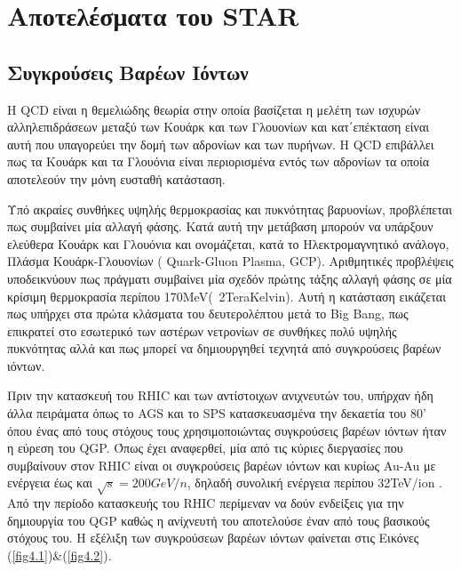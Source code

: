 \chapter{Αποτελέσματα του STAR}

\section{Συγκρούσεις Βαρέων Ιόντων}

	Η QCD  είναι η θεμελιώδης θεωρία στην οποία βασίζεται η μελέτη των ισχυρών αλληλεπιδράσεων μεταξύ των Κουάρκ και των Γλουονίων και κατ΄επέκταση είναι αυτή που υπαγορεύει την δομή των αδρονίων και των πυρήνων.
	Η 	QCD επιβάλλει πως τα Κουάρκ και τα Γλουόνια είναι περιορισμένα εντός των αδρονίων τα οποία αποτελεούν την μόνη ευσταθή κατάσταση.
	
	Υπό ακραίες συνθήκες υψηλής θερμοκρασίας και πυκνότητας βαρυονίων, προβλέπεται πως συμβαίνει μία αλλαγή φάσης. Κατά αυτή την μετάβαση μπορούν να υπάρξουν ελεύθερα Κουάρκ και Γλουόνια και ονομάζεται, κατά το Ηλεκτρομαγνητικό ανάλογο, Πλάσμα Κουάρκ-Γλουονίων ( Quark-Gluon Plasma, GCP).  
	Αριθμητικές προβλέψεις υποδεικνύουν πως πράγματι συμβαίνει μία σχεδόν πρώτης τάξης αλλαγή φάσης σε μία κρίσιμη θερμοκρασία περίπου 170MeV(~2TeraKelvin).
	Αυτή η κατάσταση εικάζεται πως υπήρχει στα πρώτα κλάσματα του δευτερολέπτου μετά το Big Bang, πως επικρατεί στο εσωτερικό των αστέρων νετρονίων σε συνθήκες πολύ υψηλής πυκνότητας αλλά και πως μπορεί να δημιουργηθεί τεχνητά από συγκρούσεις βαρέων ιόντων.
		
	
	Πριν την κατασκευή του RHIC και των αντίστοιχων ανιχνευτών του, υπήρχαν ήδη άλλα πειράματα όπως το AGS και το SPS κατασκευασμένα την δεκαετία του 80' όπου ένας από τους στόχους τους χρησιμοποιώντας συγκρούσεις βαρέων ιόντων ήταν η εύρεση του QGP. 
	Όπως έχει αναφερθεί, μία από τις κύριες διεργασίες που συμβαίνουν στον RHIC είναι οι συγκρούσεις βαρέων ιόντων και κυρίως Au-Au με ενέργεια έως και $\sqrt{s}=200GeV/n$, δηλαδή συνολική ενέργεια περίπου 32TeV/ion .
	 Από την περίοδο κατασκευής του RHIC περίμεναν να δούν ενδείξεις για την δημιουργία του QGP καθώς η ανίχνευτή του αποτελούσε έναν από τους βασικούς στόχους του.
	Η εξέλιξη των συγκρούσεων βαρέων ιόντων φαίνεται στις Εικόνες (\ref{fig4.1})\&(\ref{fig4.2}). 
	
